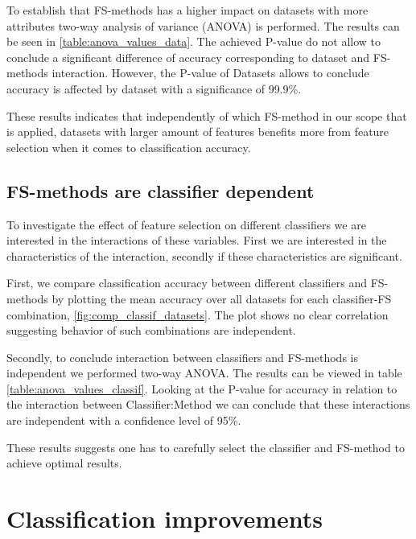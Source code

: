 To establish that FS-methods has a higher impact on datasets with more attributes two-way analysis of variance (ANOVA) is performed. The results can be seen in \ref{table:anova_values_data}. The achieved P-value do not allow to conclude a significant difference of accuracy corresponding to dataset and FS-methods interaction. However, the P-value of Datasets allows to conclude accuracy is affected by dataset with a significance of 99.9\%.



These results indicates that independently of which FS-method in our scope that is applied, datasets with larger amount of features benefits more from feature selection when it comes to classification accuracy.

\subsection{FS-methods are classifier dependent}
\label{sec:fs_methods_classifiers}

To investigate the effect of feature selection on different classifiers we are interested in the interactions of these variables. First we are interested in the characteristics of the interaction, secondly if these characteristics are significant.

First, we compare classification accuracy between different classifiers and FS-methods by plotting the mean accuracy over all datasets for each classifier-FS combination, \ref{fig:comp_classif_datasets}. The plot shows no clear correlation suggesting behavior of such combinations are independent.

Secondly, to conclude interaction between classifiers and FS-methods is independent we performed two-way ANOVA. The results can be viewed in table \ref{table:anova_values_classif}. Looking at the P-value for accuracy in relation to the interaction between Classifier:Method we can conclude that these interactions are independent with a confidence level of 95\%.



These results suggests one has to carefully select the classifier and FS-method to achieve optimal results.


\section{Classification improvements}

